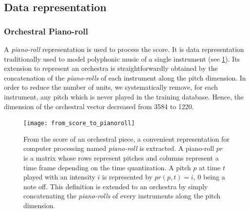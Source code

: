 \documentclass{article}
\begin{document}
\subsection{Data representation}
\subsubsection{Orchestral Piano-roll}
A \textit{piano-roll} representation is used to process the score.  It is  data representation traditionally used to model polyphonic music of a single instrument (see \ref{fig:piano-roll}). 
Its extension to represent an orchestra is straightforwardly obtained by the concatenation of the \textit{piano-rolls} of each instrument along the pitch dimension.
In order to reduce the number of units, we systematically remove, for each instrument, any pitch which is never played in the training database. Hence, the dimension of the orchestral vector decreased from 3584 to 1220.

\begin{figure}[ht]
\centering
\texttt{[image: from\_score\_to\_pianoroll]}
\caption{From the score of an orchestral piece, a convenient representation for computer processing named \textit{piano-roll} is extracted. A piano-roll $pr$ is a matrix whose rows represent pitches and columns represent a time frame depending on the time quantization. A pitch $p$ at time $t$ played with an intensity $i$ is represented by $pr(p,t) = i$, $0$ being a note off. This definition is extended to an orchestra by simply concatenating the \textit{piano-rolls} of every instruments along the pitch dimension.}
\label{fig:piano-roll}
\end{figure}
\end{document}
